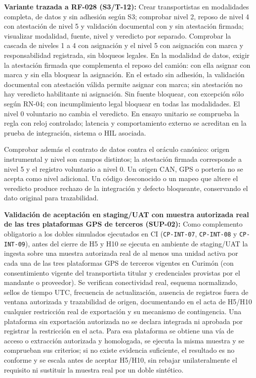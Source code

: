\par\noindent\textbf{Variante trazada a RF-028 (S3/T-12):} Crear transportistas en modalidades completa, de datos y sin adhesión según S3; comprobar nivel 2, reposo de nivel 4 con atestación de nivel 5 y validación documental con y sin atestación firmada; visualizar modalidad, fuente, nivel y veredicto por separado. Comprobar la cascada de niveles 1 a 4 con asignación y el nivel 5 con asignación con marca y responsabilidad registrada, sin bloqueos legales. En la modalidad de datos, exigir la atestación firmada que complementa el reposo del camión: con ella asignar con marca y sin ella bloquear la asignación. En el estado sin adhesión, la validación documental con atestación válida permite asignar con marca; sin atestación no hay veredicto habilitante ni asignación. Sin fuente bloquear, con excepción sólo según RN-04; con incumplimiento legal bloquear en todas las modalidades. El nivel 0 voluntario no cambia el veredicto. En ensayo unitario se comprueba la regla con reloj controlado; latencia y comportamiento externo se acreditan en la prueba de integración, sistema o HIL asociada.\par

\par\noindent Comprobar además el contrato de datos contra el oráculo canónico: origen instrumental y nivel son campos distintos; la atestación firmada corresponde a nivel 5 y el registro voluntario a nivel 0. Un origen CAN, GPS o portería no se acepta como nivel adicional. Un código desconocido o un mapeo que altere el veredicto produce rechazo de la integración y defecto bloqueante, conservando el dato original para trazabilidad.\par

\par\noindent\textbf{Validación de aceptación en staging/UAT con muestra autorizada real de las tres plataformas GPS de terceros (SUP-02):} Como complemento obligatorio a los dobles simulados ejecutados en CI (\texttt{CP-INT-07}, \texttt{CP-INT-08} y \texttt{CP-INT-09}), antes del cierre de H5 y H10 se ejecuta en ambiente de staging/UAT la ingesta sobre una muestra autorizada real de al menos una unidad activa por cada una de las tres plataformas GPS de terceros vigentes en Curimón (con consentimiento vigente del transportista titular y credenciales provistas por el mandante o proveedor). Se verifican conectividad real, esquema normalizado, sellos de tiempo UTC, frecuencia de actualización, ausencia de registros fuera de ventana autorizada y trazabilidad de origen, documentando en el acta de H5/H10 cualquier restricción real de exportación y su mecanismo de contingencia. Una plataforma sin exportación autorizada no se declara integrada ni aprobada por registrar la restricción en el acta. Para esa plataforma se obtiene una vía de acceso o extracción autorizada y homologada, se ejecuta la misma muestra y se comprueban sus criterios; si no existe evidencia suficiente, el resultado es no conforme y se escala antes de aceptar H5/H10, sin rebajar unilateralmente el requisito ni sustituir la muestra real por un doble sintético.\par

